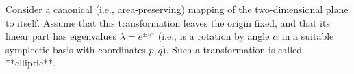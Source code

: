 Consider a canonical (i.e., area-preserving) mapping of the two-dimensional plane to itself. Assume that this transformation leaves the origin fixed, and that its linear part has eigenvalues $\lambda = e^{\pm i\alpha}$ (i.e., is a rotation by angle $\alpha$ in a suitable symplectic basis with coordinates $p, q$). Such a transformation is called **elliptic**.
